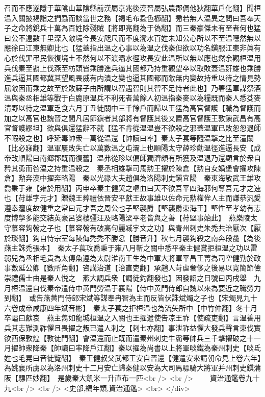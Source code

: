 召而不應遂隱于華隂山華隂縣前漢屬京兆後漢晉屬弘農郡倜他狄翻華戶化翻】聞桓温入關披褐詣之捫蝨而談當世之務【褐毛布蝨色櫛翻】㫄若無人温異之問曰吾奉天子之命將銳兵十萬為百姓除殘賊【將即亮翻為于偽翻】而三秦豪傑未有至者何也猛曰公不遠數千里深入敵境今長安咫尺而不度灞水百姓未知公心所以不至温嘿然無以應徐曰江東無卿比也【猛蓋指出温之心事以為温之伐秦但欲以功名鎭服江東非眞有心於伐罪弔民恢復境土不然何以不渡灞水徑攻長安此温所以無以應也然余觀桓温用兵伐秦至覇上伐燕至枋頭皆乘勝進兵逼其國都乃持重觀望卒以取敗蓋温姧雄也乘勝進兵逼其國都冀其望風畏威有内潰之變也逼其國都而敵無内變故持重以待之情見勢屈敵因而乘之故至於敗蘇子由所謂以智遇智則其智不足恃者此也】乃署猛軍謀祭酒温與秦丞相雄等戰于白鹿原温兵不利死者萬餘人初温指秦麥以為糧既而秦人悉芟麥清野以待之温軍乏食六月丁丑徙關中三千餘戶而歸以王猛為高官督護【職為督護而加之以高官也魏晉之間凡居節鎭者其部將有督護其後又置高官督護王敦鎭武昌有高官督護繆坦】欲與俱還猛辭不就【猛不肯從温温豈不欲殺之邪蓋温軍已敗怱怱退師不暇殺之也】呼延毒帥衆一萬從温還【帥讀曰率】秦太子萇等隨温撃之比至潼關【比必寐翻】温軍屢敗失亡以萬數温之屯灞上也順陽太守薛珍勸温徑進逼長安【成帝改順陽曰南郷郡既而復舊】温弗從珍以偏師獨濟頗有所獲及温退乃還顯言於衆自矜其勇而咎温之持重温殺之　秦丞相雄撃司馬勲王擢於陳倉【勲自女媧堡會擢攻陳倉】勲奔漢中擢奔略陽　秦以光祿大夫趙俱為洛陽刺史鎭宜陽　秦東海敬武王雄攻喬秉于雍【雍於用翻】丙申卒秦主健哭之嘔血曰天不欲吾平四海邪何奪吾元才之速也【苻雄字元才】贈魏王葬禮依晉安平獻王故事雄以佐命元勲權侔人主而謙恭汎愛遵奉灋度故健重之常曰元才吾之周公也子堅襲爵【堅襲爵東海王】堅性至孝幼有志度博學多能交結英豪呂婆樓彊汪及略陽梁平老皆與之善【苻堅事始此】　燕樂陵太守慕容鉤翰之子也【慕容翰有破高句麗㓕宇文之功】與青州刺史朱禿共治厭次【厭於琰翻】鉤自恃宗室每陵侮禿禿不勝忿【勝音升】秋七月襲鉤殺之南奔段龕【為後燕主誅禿張本】　秦太子萇攻喬秉于雍八月斬之關中悉平秦主健賞拒桓温之功以雷弱兒為丞相毛貴為太傅魚遵為太尉淮南王生為中軍大將軍平昌王菁為司空健勤於政事數延公卿【數所角翻】咨講治道【治直吏翻】承趙人苛虐奢侈之後易以寛簡節儉崇禮儒士由是秦人悦之　燕大調兵衆【調徒釣翻發也】因發詔之日號曰丙戌舉　九月桓温還自伐秦帝遣侍中黄門勞温于襄陽【侍中黄門侍郎自魏以來為要近之職勞力到翻】　或告燕黄門侍郎宋斌等謀奉冉智為主而反皆伏誅斌燭之子也【宋燭見九十六卷成帝咸康四年斌音彬】　秦太子萇之拒桓温也為流矢所中【中竹仲翻】冬十月卒謚曰獻哀　燕主雋如龍城桓温之入關也王擢遣使告凉王祚【使疏吏翻】言温善用兵其志難測祚懼且畏擢之叛已遣人刺之【刺七亦翻】事泄祚益懼大發兵聲言東伐實欲西保敦煌【敦徒門翻】會温還而止既而遣秦州刺史牛霸等帥兵三千擊擢破之十一月擢帥衆降秦【帥讀曰率降戶江翻】秦以擢為尚書以上將軍啖鐵為秦州刺史【啖氐姓也毛晃曰音徒覽翻】　秦王健叔父武都王安自晉還【健遣安來請朝命見上卷六年】為姚襄所虜以為洛州刺史十二月安亡歸秦健以安為大司馬驃騎大將軍并州刺史鎭蒲阪【驃匹妙翻】　是歲秦大飢米一升直布一匹<br />
<br />
　　資治通鑑卷九十九<br />
<br />
<史部,編年類,資治通鑑>  <br>
   </div> 

